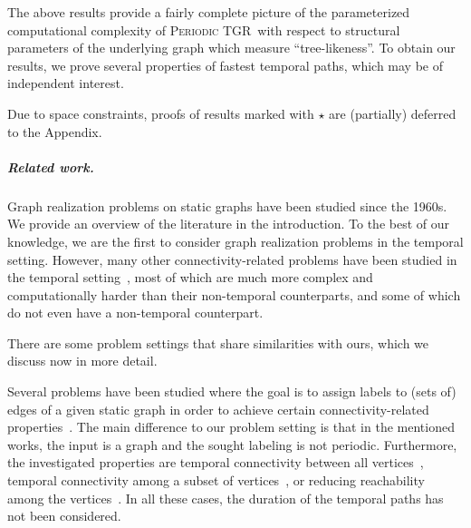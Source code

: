 \documentclass[a4paper,UKenglish,cleveref, autoref, thm-restate, anonymous]{lipics-v2021}
\newcommand{\deltaExact}{\textsc{Periodic TGR}}
\begin{document}
The above results provide a fairly complete picture of the parameterized computational complexity of \deltaExact\ with respect to structural parameters of the underlying graph which measure ``tree-likeness''. To obtain our results, we prove several properties of fastest temporal paths, which may be of independent interest.

Due to space constraints, proofs of results marked with $\star$ are (partially) deferred to the Appendix.


\subparagraph{Related work.} Graph realization problems on static graphs have been studied since the 1960s. We provide an overview of the literature in the introduction. 
To the best of our knowledge, we are the first to consider graph realization problems in the temporal setting. However, many other connectivity-related problems have been studied in the temporal setting~\cite{Mertzios-transitivity21,Akrida-explorer-21,enright2021deleting,MolterRZ21,klobas2023interference,deligkas2022optimizing,erlebach2021temporal,Flu+19a,Zsc+19,CasteigtsCS22,FuchsleMNR22}, most of which are much more complex and computationally harder than their non-temporal counterparts, and some of which do not even have a non-temporal counterpart.

There are some problem settings that share similarities with ours, which we discuss now in more detail.

Several problems have been studied where the goal is to assign labels to (sets of) edges of a given static graph in order to achieve certain connectivity-related properties~\cite{KlobasMMS22,MertziosMS19,akrida2017complexity,enright2021assigning}. The main difference to our problem setting is that in the mentioned works, the input is a graph and the sought labeling is not periodic. Furthermore, the investigated properties are temporal connectivity between all vertices~\cite{KlobasMMS22,MertziosMS19,akrida2017complexity}, temporal connectivity among a subset of vertices~\cite{KlobasMMS22}, or reducing reachability among the vertices~\cite{enright2021assigning}. In all these cases, the duration of the temporal paths has not been considered.


\end{document}
